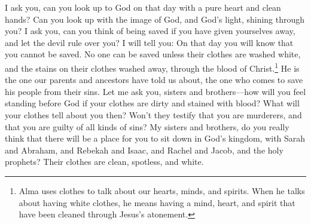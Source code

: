 \bverse \iffalse I say unto you, can ye look up to God at that day with a pure heart and clean hands? I say unto you, can you look up, having the image of God engraven upon your countenances? \fi
I ask you, can you look up to God on that day with a pure heart and clean hands? Can you look up with the image of God, and God's light, shining through you?
\bverse \iffalse I say unto you, can ye think of being saved when you have yielded yourselves to become subjects to the devil? \fi
I ask you, can you think of being saved if you have given yourselves away, and let the devil rule over you?
\bverse \iffalse I say unto you, ye will know at that day that ye cannot be saved; for there can no man be saved except his garments are washed white; yea, his garments must be purified until they are cleansed from all stain, through the blood of him of whom it has been spoken by our fathers, who should come to redeem his people from their sins. \fi
I will tell you: On that day you will know that you cannot be saved. No one can be saved unless their clothes are washed white, and the stains on their clothes washed away, through the blood of Christ.\footnote{Alma uses clothes to talk about our hearts, minds, and spirits. When he talks about having white clothes, he means having a mind, heart, and spirit that have been cleaned through Jesus's atonement.} He is the one our parents and ancestors have told us about, the one who comes to save his people from their sins.
\bverse \iffalse And now I ask of you, my brethren, how will any of you feel, if ye shall stand before the bar of God, having your garments stained with blood and all manner of filthiness? Behold, what will these things testify against you? \fi
Let me ask you, sisters and brothers---how will you feel standing before God if your clothes are dirty and stained with blood? What will your clothes tell about you then?
\bverse \iffalse Behold will they not testify that ye are murderers, yea, and also that ye are guilty of all manner of wickedness? \fi
Won't they testify that you are murderers, and that you are guilty of all kinds of sins?
\bverse \iffalse Behold, my brethren, do ye suppose that such an one can have a place to sit down in the kingdom of God, with Abraham, with Isaac, and with Jacob, and also all the holy prophets, whose garments are cleansed and are spotless, pure and white? \fi
My sisters and brothers, do you really think that there will be a place for you to sit down in God's kingdom, with Sarah and Abraham, and Rebekah and Isaac, and Rachel and Jacob, and the holy prophets? Their clothes are clean, spotless, and white.
